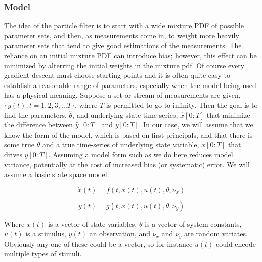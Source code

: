 \documentclass{article}
\begin{document}
\subsubsection{Model}
The idea of the particle
filter is to start with a wide mixture PDF of possible parameter sets, 
and then, as measurements come in, to weight more heavily parameter sets 
that tend to give good estimations of the measurements. The reliance on
an initial mixture PDF can introduce bias; however, this effect can be
minimized by alterring the initial weights in the mixture pdf. Of course
every gradient descent must choose starting points and it is often quite
easy to establish a reasonable range of parameters, especially when the
model being used has a physical meaning. Suppose a set or stream of measurements
are given, $\{y(t), t = 1, 2, 3, ... T\}$, where $T$ is permitted to go
 to infinity. Then the goal is to find the 
parameters, $\hat{\theta}$, and underlying state time series, $\hat{x}[0:T]$
that minimize the difference between $\hat{y}[0:T]$
and $y[0:T]$. In our case, we will assume that we know the form
of the model, which is based on first principals, and that
there is some true $\theta$ and a true time-series of underlying
state variable, $x[0:T]$ that drives $y[0:T]$. Assuming a model form 
such as we do here reduces model variance, potentially at the cost of increased
bias (or systematic) error. We will assume a basic state space model:

\begin{equation}
\dot{x}(t) = f(t, x(t), u(t), \theta, \nu_x)
\end{equation}

\begin{equation}
y(t) = g(t, x(t), u(t), \theta, \nu_y)
\end{equation}

Where $x(t)$ is a vector of state variables, $\theta$ is a vector of system
constants, $u(t)$ is a stimulus, $y(t)$ an observation, and
$\nu_x$ and $\nu_y$ are random variates. Obviously any one of these could
be a vector, so for instance $u(t)$ could encode multiple types of stimuli.
\end{document}
